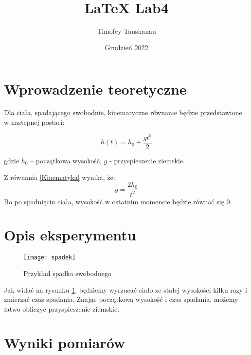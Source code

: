 \documentclass[a4paper,12pt]{article}
\title{LaTeX Lab4}
\author{Timofey Taushanau}
\date{Grudzień 2022}
\begin{document}
\maketitle

\section{Wprowadzenie teoretyczne}

Dla ciała, spadającego swobodnie, kinematyczne równanie będzie przedstawione w następnej postaci:

\begin{equation}\label{Kinematyka}
    h(t) = h_0 + \frac{gt^2}{2}
\end{equation}

gdzie $h_0$ – początkowa wysokość, $g$ - przyspieszenie ziemskie.

Z równania \eqref{Kinematyka} wynika, że:
\begin{equation}\label{Przyspieszenie}
    g = \frac{2h_0}{t^2}
\end{equation}
Bo po spadnięciu ciała, wysokość w ostatnim momencie będzie równać się 0.

\section{Opis eksperymentu}

\begin{figure}[h]
    \centering
    \texttt{[image: spadek]}
    \caption{Przykład spadka swobodnego}
    \label{fig:rys1}
\end{figure}

Jak widać na rysunku \ref{fig:rys1}, będziemy wyrzucać ciało ze stałej wysokości kilku razy i zmierzać czas spadania. Znając początkową wysokość i czas spadania, możemy łatwo obliczyć przyspieszenie ziemskie.

\section{Wyniki pomiarów}
\end{document}
